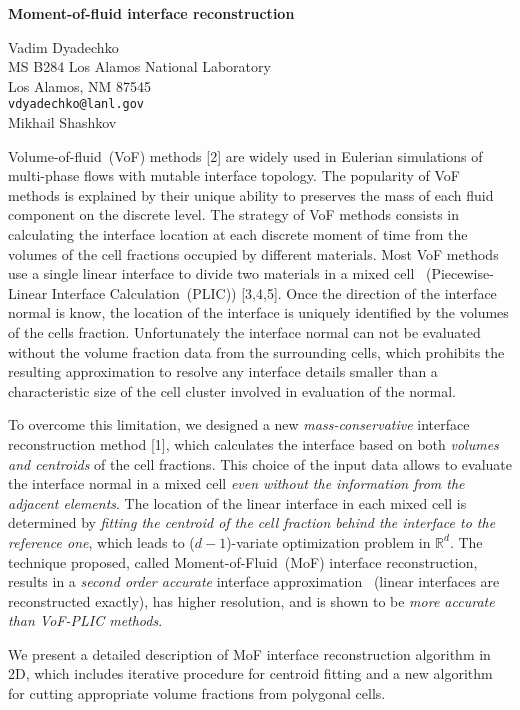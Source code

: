 \documentclass{report}
\newcommand{\Reals}{\mathbb{R}}
\begin{document}

\begin{center}
{\large
{\bf Moment-of-fluid interface reconstruction}}

	Vadim Dyadechko \\
	MS B284 Los Alamos National Laboratory \\
	Los Alamos, NM 87545 \\
	{\tt vdyadechko@lanl.gov} \\
	Mikhail Shashkov
\end{center}
Volume-of-fluid~(VoF) methods [2] are widely used in
Eulerian simulations of multi-phase flows with mutable
interface topology. The popularity of VoF methods is
explained by their unique ability to preserves the mass of
each fluid component on the discrete level. The strategy of
VoF methods consists in calculating the interface location
at each discrete moment of time from the volumes of the cell
fractions occupied by different materials. Most VoF methods
use a single linear interface to divide two materials in a
mixed cell ~(Piecewise-Linear Interface Calculation~(PLIC))
[3,4,5]. Once the direction of the interface normal is know,
the location of the interface is uniquely identified by the
volumes of the cells fraction. Unfortunately the interface
normal can not be evaluated without the volume fraction data
from the surrounding cells, which prohibits the resulting
approximation to resolve any interface details smaller than
a characteristic size of the cell cluster involved in
evaluation of the normal.

To overcome this limitation, we
designed a new \emph{mass-conservative} interface
reconstruction method [1], which calculates the interface
based on both \emph{volumes and centroids} of the cell
fractions. This choice of the input data allows to evaluate
the interface normal in a mixed cell \emph{even without the
information from the adjacent elements}. The location of the
linear interface in each mixed cell is determined by
\emph{fitting the centroid of the cell fraction behind the
interface to the reference one}, which leads to
($d\!-\!1$)-variate optimization problem in $\Reals^d$. The
technique proposed, called Moment-of-Fluid~(MoF) interface
reconstruction, results in a \emph{second order accurate}
interface approximation~ (linear interfaces are
reconstructed exactly), has higher resolution, and is shown
to be \emph{more accurate than VoF-PLIC methods}.

We
present a detailed description of MoF interface
reconstruction algorithm in 2D, which includes iterative
procedure for centroid fitting and a new algorithm for
cutting appropriate volume fractions from polygonal cells.
\end{document}
